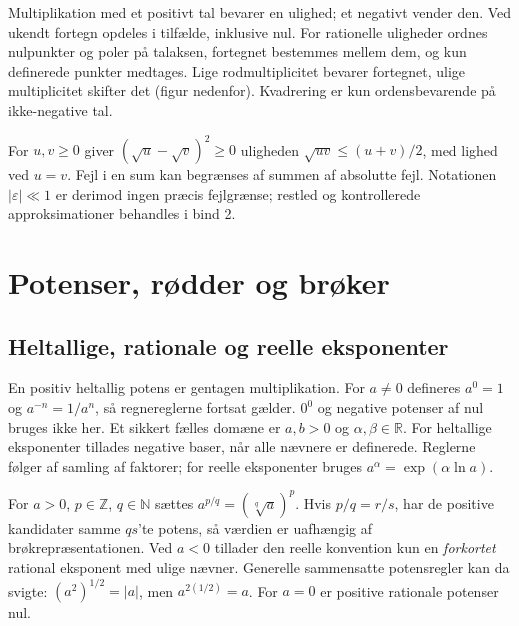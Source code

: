Multiplikation med et positivt tal bevarer en ulighed; et negativt vender
den. Ved ukendt fortegn opdeles i tilfælde, inklusive nul. For rationelle
uligheder ordnes nulpunkter og poler på talaksen, fortegnet bestemmes
mellem dem, og kun definerede punkter medtages. Lige rodmultiplicitet
bevarer fortegnet, ulige multiplicitet skifter det (figur nedenfor).
Kvadrering er kun ordensbevarende på ikke-negative tal.

For $u,v\ge0$ giver $(\sqrt u-\sqrt v)^2\ge0$ uligheden
$\sqrt{uv}\le(u+v)/2$, med lighed ved $u=v$.
Fejl i en sum kan begrænses af summen af absolutte fejl. Notationen
$|\varepsilon|\ll1$ er derimod ingen præcis fejlgrænse; restled og
kontrollerede approksimationer behandles i bind 2.

\section{Potenser, rødder og brøker}
\label{sec:potenser-broeker}
\subsection{Heltallige, rationale og reelle eksponenter}
En positiv heltallig potens er gentagen multiplikation.
For $a\ne0$ defineres $a^0=1$ og $a^{-n}=1/a^n$, så regnereglerne
fortsat gælder. $0^0$ og negative potenser af nul bruges ikke her.
Et sikkert fælles domæne er $a,b>0$ og $\alpha,\beta\in\mathbb R$.
For heltallige eksponenter tillades negative baser, når alle nævnere er
definerede. Reglerne følger af samling af faktorer; for reelle eksponenter
bruges $a^\alpha=\exp(\alpha\ln a)$.

For $a>0$, $p\in\mathbb Z$, $q\in\mathbb N$ sættes
$a^{p/q}=(\sqrt[q]a)^p$. Hvis $p/q=r/s$, har de positive kandidater samme
$qs$'te potens, så værdien er uafhængig af brøkrepræsentationen.
Ved $a<0$ tillader den reelle konvention kun en \emph{forkortet} rational
eksponent med ulige nævner. Generelle sammensatte potensregler kan da
svigte: $(a^2)^{1/2}=|a|$, men $a^{2(1/2)}=a$.
For $a=0$ er positive rationale potenser nul.

